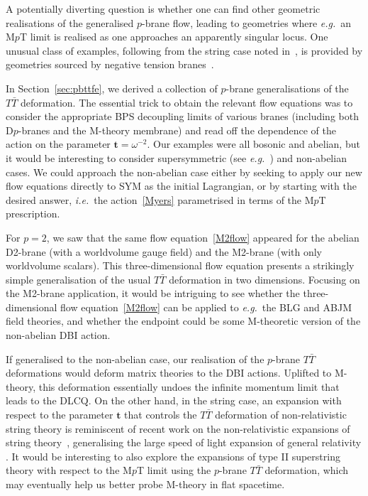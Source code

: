 \documentclass[11pt]{article}
\renewcommand{\emph}[1]{\textit{#1}}
\newcommand{\lambdap}{\boldsymbol{t}}
\begin{document}
A potentially diverting question is whether one can find other geometric realisations of the generalised $p$-brane flow, leading to geometries where \emph{e.g.}~an M$p$T limit is realised as one approaches an apparently singular locus. One unusual class of examples, following from the string case noted in~\cite{Blair:2020ops}, is provided by geometries sourced by negative tension branes~\cite{Dijkgraaf:2016lym}.

In Section~\ref{sec:pbttfe}, we derived a collection of $p$-brane generalisations of the $T\bar T$ deformation. 
The essential trick to obtain the relevant flow equations was to consider the appropriate BPS decoupling limits of various branes (including both D$p$-branes and the M-theory membrane) and read off the dependence of the action on the parameter $\lambdap = \omega^{-2}$. 
Our examples were all bosonic and abelian, but it would be interesting to consider supersymmetric (see \emph{e.g.}~\cite{Baggio:2018rpv,Chang:2018dge,Ferko:2023sps}) and non-abelian cases. 
We could approach the non-abelian case either by seeking to apply our new flow equations directly to SYM as the initial Lagrangian, or by starting with the desired answer, \emph{i.e.}~the action~\eqref{Myers} parametrised in terms of the M$p$T prescription.

For $p=2$, we saw that the same flow equation~\eqref{M2flow} appeared for the abelian D2-brane (with a worldvolume gauge field) and the M2-brane (with only worldvolume scalars). This three-dimensional flow equation presents a strikingly simple generalisation of the usual $T\bar T$ deformation in two dimensions. 
Focusing on the M2-brane application, it would be intriguing to see 
whether the three-dimensional flow equation~\eqref{M2flow} can be applied to \emph{e.g.}~the BLG and ABJM field theories, and whether the endpoint could be some M-theoretic version of the non-abelian DBI action.

If generalised to the non-abelian case, our realisation of the $p$-brane $T\bar{T}$ deformations would deform matrix theories to the DBI actions. Uplifted to M-theory, this deformation essentially undoes the infinite momentum limit that leads to the DLCQ. On the other hand, in the string case, an expansion with respect to the parameter $\lambdap$ that controls the $T\bar{T}$ deformation of non-relativistic string theory is reminiscent of recent work on the non-relativistic expansions of string theory~\cite{Hartong:2021ekg, Hartong:2022dsx, Hartong:2024ydv}, generalising the large speed of light expansion of general relativity \cite{VandenBleeken:2017rij, Hansen:2019pkl, Hansen:2020pqs}. It would be interesting to also explore the expansions of type II superstring theory with respect to the M$p$T limit using the $p$-brane $T\bar{T}$ deformation, which may eventually help us better probe M-theory in flat spacetime. 
\end{document}
